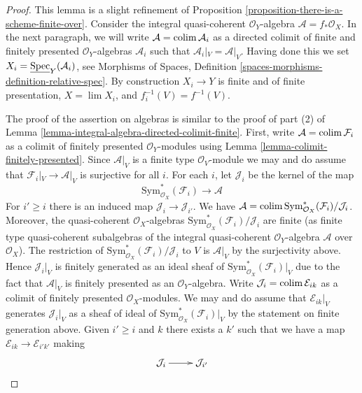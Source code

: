 \begin{proof}
This lemma is a slight refinement of Proposition
\ref{proposition-there-is-a-scheme-finite-over}.
Consider the integral quasi-coherent $\mathcal{O}_Y$-algebra
$\mathcal{A} = f_*\mathcal{O}_X$. In the next paragraph, we will
write $\mathcal{A} = \mathop{\mathrm{colim}}\nolimits \mathcal{A}_i$ as a directed
colimit of finite and finitely presented $\mathcal{O}_Y$-algebras
$\mathcal{A}_i$ such that $\mathcal{A}_i|_V = \mathcal{A}|_V$.
Having done this we set $X_i = \underline{\mathop{\mathrm{Spec}}}_Y(\mathcal{A}_i)$, see
Morphisms of Spaces, Definition
\ref{spaces-morphisms-definition-relative-spec}.
By construction $X_i \to Y$ is finite and of finite presentation,
$X = \lim X_i$, and $f_i^{-1}(V) = f^{-1}(V)$.

\medskip\noindent
The proof of the assertion on algebras is similar to
the proof of part (2) of
Lemma \ref{lemma-integral-algebra-directed-colimit-finite}.
First, write $\mathcal{A} = \mathop{\mathrm{colim}}\nolimits \mathcal{F}_i$
as a colimit of finitely presented $\mathcal{O}_Y$-modules using
Lemma \ref{lemma-colimit-finitely-presented}.
Since $\mathcal{A}|_V$ is a finite type $\mathcal{O}_V$-module
we may and do assume that $\mathcal{F}_i|_V \to \mathcal{A}|_V$
is surjective for all $i$.
For each $i$, let $\mathcal{J}_i$ be the kernel of the map
$$
\text{Sym}^*_{\mathcal{O}_X}(\mathcal{F}_i) \longrightarrow \mathcal{A}
$$
For $i' \geq i$ there is an induced map $\mathcal{J}_i \to \mathcal{J}_{i'}$.
We have $\mathcal{A} =
\mathop{\mathrm{colim}}\nolimits \text{Sym}^*_{\mathcal{O}_X}(\mathcal{F}_i)/\mathcal{J}_i$.
Moreover, the quasi-coherent $\mathcal{O}_X$-algebras
$\text{Sym}^*_{\mathcal{O}_X}(\mathcal{F}_i)/\mathcal{J}_i$
are finite (as finite type quasi-coherent subalgebras of the integral
quasi-coherent $\mathcal{O}_Y$-algebra $\mathcal{A}$ over $\mathcal{O}_X$).
The restriction of $\text{Sym}^*_{\mathcal{O}_X}(\mathcal{F}_i)/\mathcal{J}_i$
to $V$ is $\mathcal{A}|_V$ by the surjectivity above.
Hence $\mathcal{J}_i|_V$ is finitely generated as an ideal sheaf of
$\text{Sym}^*_{\mathcal{O}_X}(\mathcal{F}_i)|_V$ due to the
fact that $\mathcal{A}|_V$ is finitely presented as an
$\mathcal{O}_Y$-algebra.
Write $\mathcal{J}_i = \mathop{\mathrm{colim}}\nolimits \mathcal{E}_{ik}$
as a colimit of finitely presented $\mathcal{O}_X$-modules.
We may and do assume that $\mathcal{E}_{ik}|_V$
generates $\mathcal{J}_i|_V$ as a sheaf of ideal of
$\text{Sym}^*_{\mathcal{O}_X}(\mathcal{F}_i)|_V$ by the
statement on finite generation above.
Given $i' \geq i$ and $k$ there exists a $k'$ such that we
have a map $\mathcal{E}_{ik} \to \mathcal{E}_{i'k'}$
making
$$
\xymatrix{
\mathcal{J}_i \ar[r] & \mathcal{J}_{i'} \\
}$$
\end{proof}
